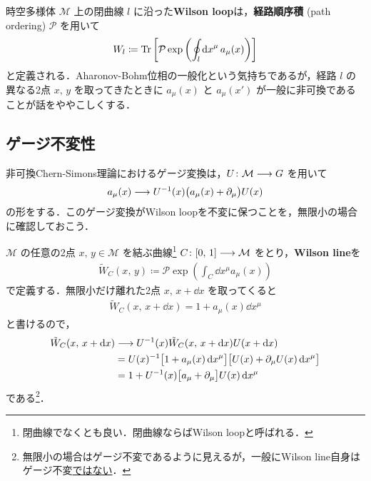 \documentclass[TQFT_main]{subfiles}
\begin{document}
時空多様体 $\mathcal{M}$ 上の閉曲線 $l$ に沿った\textbf{Wilson loop}は，\textbf{経路順序積} (path ordering) $\mathcal{P}$ を用いて
\begin{align}
    W_l \coloneqq \Tr \left[ \mathcal{P} \exp \left( \oint_l \dd{x}^\mu a_\mu (x) \right)  \right] 
\end{align}
と定義される．Aharonov-Bohm位相の一般化という気持ちであるが，経路 $l$ の異なる2点 $x,\, y$ を取ってきたときに $a_\mu (x)$ と $a_\mu (x')$ が一般に非可換であることが話をややこしくする．
\subsection{ゲージ不変性}

非可換Chern-Simons理論におけるゲージ変換は，$U \colon \mathcal{M} \longrightarrow G$ を用いて
\begin{align}
    \label{eq:gauge-transform}
    a_\mu(x) \longrightarrow U^{-1}(x) \bigl(a_\mu(x) + \partial_\mu\bigr) U(x)
\end{align}
の形をする．このゲージ変換がWilson loopを不変に保つことを，無限小の場合に確認しておこう．

$\mathcal{M}$ の任意の2点 $x,\, y \in \mathcal{M}$ を結ぶ曲線\footnote{閉曲線でなくとも良い．閉曲線ならばWilson loopと呼ばれる．} $C \colon [0,\, 1] \longrightarrow \mathcal{M}$ をとり，\textbf{Wilson line}を
\begin{align}
    \tilde{W}_C (x,\, y) \coloneqq \mathcal{P} \exp \left( \int_C \dd{x^\mu} a_\mu (x) \right)
\end{align}
で定義する．無限小だけ離れた2点 $x,\, x + \dd{x}$ を取ってくると
\begin{align}
    \tilde{W}_C (x,\, x + \dd{x}) = 1 + a_\mu (x)\dd{x^\mu}
\end{align}
と書けるので，
\begin{align}
    \tilde{W}_C (x,\, x + \dd{x}) &\longrightarrow U^{-1}(x) \tilde{W}_C (x,\, x + \dd{x}) U(x + \dd{x}) \\
    &= U(x)^{-1} \bigl[ 1 + a_\mu (x) \dd{x^\mu} \bigr] \bigl[ U(x) + \partial_\mu U(x) \dd{x^\mu} \bigr] \\
    &= 1 + U^{-1}(x)\bigl[ a_\mu + \partial_\mu \bigr] U(x) \dd{x^\mu}
\end{align}
である\footnote{無限小の場合はゲージ不変であるように見えるが，一般にWilson line自身はゲージ不変\underline{ではない}．}．
\end{document}
